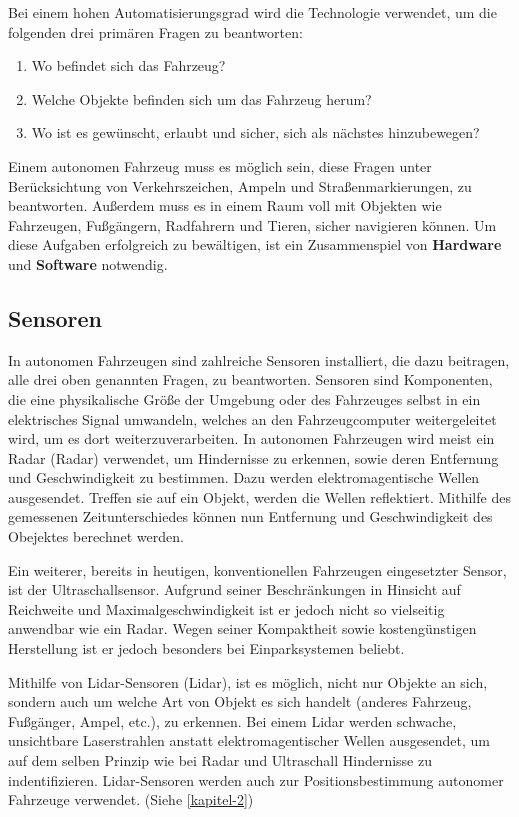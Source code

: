 Bei einem hohen Automatisierungsgrad wird die Technologie verwendet, um die folgenden drei primären Fragen zu beantworten:
\begin{enumerate}
  \item{Wo befindet sich das Fahrzeug?}
  \item{Welche Objekte befinden sich um das Fahrzeug herum?}
  \item{Wo ist es gewünscht, erlaubt und sicher, sich als nächstes hinzubewegen?}
\end{enumerate}

Einem autonomen Fahrzeug muss es möglich sein, diese Fragen unter Berücksichtung von Verkehrszeichen, Ampeln und Straßenmarkierungen, zu beantworten. Außerdem muss es in einem Raum voll mit Objekten wie Fahrzeugen, Fußgängern, Radfahrern und Tieren, sicher navigieren können. Um diese Aufgaben erfolgreich zu bewältigen, ist ein Zusammenspiel von \textbf{Hardware} und \textbf{Software} notwendig.

\subsection{Sensoren}
In autonomen Fahrzeugen sind zahlreiche Sensoren installiert, die dazu beitragen, alle drei oben genannten Fragen, zu beantworten. Sensoren sind Komponenten, die eine physikalische Größe der Umgebung oder des Fahrzeuges selbst in ein elektrisches Signal umwandeln, welches an den Fahrzeugcomputer weitergeleitet wird, um es dort weiterzuverarbeiten.  In autonomen Fahrzeugen wird meist ein \acs{Radar} (\acl{Radar}) verwendet, um Hindernisse zu erkennen, sowie deren Entfernung und Geschwindigkeit zu bestimmen. Dazu werden elektromagentische Wellen ausgesendet. Treffen sie auf ein Objekt, werden die Wellen reflektiert. Mithilfe des gemessenen Zeitunterschiedes können nun Entfernung und Geschwindigkeit des Obejektes berechnet werden. 

Ein weiterer, bereits in heutigen, konventionellen Fahrzeugen eingesetzter Sensor, ist der Ultraschallsensor. Aufgrund seiner Beschränkungen in Hinsicht auf Reichweite und Maximalgeschwindigkeit ist er jedoch nicht so vielseitig anwendbar wie ein \acs{Radar}. Wegen seiner Kompaktheit sowie kostengünstigen Herstellung ist er jedoch besonders bei Einparksystemen beliebt.

Mithilfe von \acs{Lidar}-Sensoren (\acl{Lidar}), ist es möglich, nicht nur Objekte an sich, sondern auch um welche Art von Objekt es sich handelt (anderes Fahrzeug, Fußgänger, Ampel, etc.), zu erkennen. Bei einem \acs{Lidar} werden schwache, unsichtbare Laserstrahlen anstatt elektromagentischer Wellen ausgesendet, um auf dem selben Prinzip wie bei \acs{Radar} und Ultraschall Hindernisse zu indentifizieren. \acs{Lidar}-Sensoren werden auch zur Positionsbestimmung autonomer Fahrzeuge verwendet. (Siehe \ref{kapitel-2})

